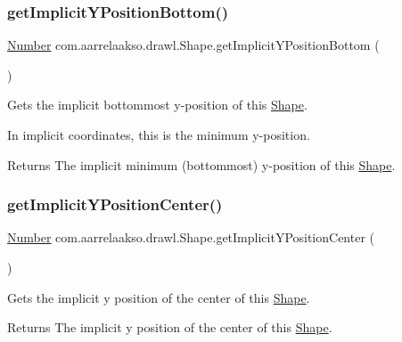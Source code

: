 \subsubsection{\texorpdfstring{get\+Implicit\+Y\+Position\+Bottom()}{getImplicitYPositionBottom()}}
{\footnotesize\ttfamily \hyperlink{interfacecom_1_1aarrelaakso_1_1drawl_1_1_number}{Number} com.\+aarrelaakso.\+drawl.\+Shape.\+get\+Implicit\+Y\+Position\+Bottom (\begin{DoxyParamCaption}{ }\end{DoxyParamCaption})\hspace{0.3cm}{\ttfamily [protected]}}



Gets the implicit bottommost y-\/position of this \hyperlink{classcom_1_1aarrelaakso_1_1drawl_1_1_shape}{Shape}. 

In implicit coordinates, this is the minimum y-\/position.

\begin{DoxyReturn}{Returns}
The implicit minimum (bottommost) y-\/position of this \hyperlink{classcom_1_1aarrelaakso_1_1drawl_1_1_shape}{Shape}. 
\end{DoxyReturn}
\mbox{\label{classcom_1_1aarrelaakso_1_1drawl_1_1_shape_a1f27f0adc1716dc60691a7d0c14f2ace}} 
\subsubsection{\texorpdfstring{get\+Implicit\+Y\+Position\+Center()}{getImplicitYPositionCenter()}}
{\footnotesize\ttfamily \hyperlink{interfacecom_1_1aarrelaakso_1_1drawl_1_1_number}{Number} com.\+aarrelaakso.\+drawl.\+Shape.\+get\+Implicit\+Y\+Position\+Center (\begin{DoxyParamCaption}{ }\end{DoxyParamCaption})\hspace{0.3cm}{\ttfamily [protected]}}



Gets the implicit y position of the center of this \hyperlink{classcom_1_1aarrelaakso_1_1drawl_1_1_shape}{Shape}. 

\begin{DoxyReturn}{Returns}
The implicit y position of the center of this \hyperlink{classcom_1_1aarrelaakso_1_1drawl_1_1_shape}{Shape}. 
\end{DoxyReturn}
\mbox{\label{classcom_1_1aarrelaakso_1_1drawl_1_1_shape_a6a52176302dd9b5d2bfc2d25409c310e}} 
